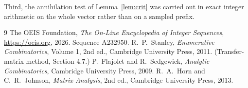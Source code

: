 \documentclass[11pt,a4paper]{article}
\theoremstyle{plain}
\theoremstyle{definition}
\begin{document}
Third, the annihilation test of Lemma~\ref{lem:crit} was carried out in exact integer
arithmetic on the whole vector rather than on a sampled prefix.

\begin{thebibliography}{9}
 The OEIS Foundation, \emph{The On-Line Encyclopedia of Integer
Sequences}, \url{https://oeis.org}, 2026. Sequence A232950.
 R.~P.~Stanley, \emph{Enumerative Combinatorics}, Volume 1, 2nd ed.,
Cambridge University Press, 2011. (Transfer-matrix method, Section 4.7.)
 P.~Flajolet and R.~Sedgewick, \emph{Analytic Combinatorics}, Cambridge
University Press, 2009.
 R.~A.~Horn and C.~R.~Johnson, \emph{Matrix Analysis}, 2nd ed., Cambridge
University Press, 2013.
\end{thebibliography}
\end{document}
